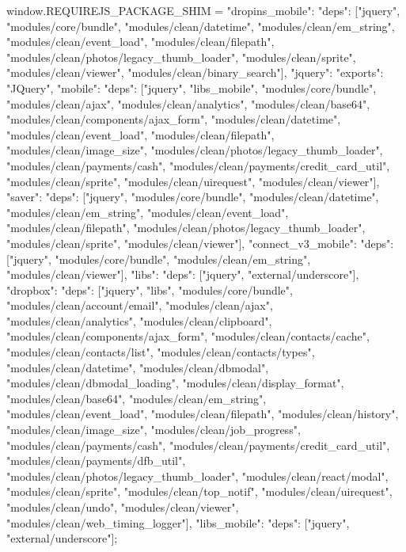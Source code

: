 {                        window.REQUIREJS_PACKAGE_SHIM = {"dropins_mobile": {"deps": ["jquery", "modules/core/bundle", "modules/clean/datetime", "modules/clean/em_string", "modules/clean/event_load", "modules/clean/filepath", "modules/clean/photos/legacy_thumb_loader", "modules/clean/sprite", "modules/clean/viewer", "modules/clean/binary_search"]}, "jquery": {"exports": "JQuery"}, "mobile": {"deps": ["jquery", "libs_mobile", "modules/core/bundle", "modules/clean/ajax", "modules/clean/analytics", "modules/clean/base64", "modules/clean/components/ajax_form", "modules/clean/datetime", "modules/clean/event_load", "modules/clean/filepath", "modules/clean/image_size", "modules/clean/photos/legacy_thumb_loader", "modules/clean/payments/cash", "modules/clean/payments/credit_card_util", "modules/clean/sprite", "modules/clean/uirequest", "modules/clean/viewer"]}, "saver": {"deps": ["jquery", "modules/core/bundle", "modules/clean/datetime", "modules/clean/em_string", "modules/clean/event_load", "modules/clean/filepath", "modules/clean/photos/legacy_thumb_loader", "modules/clean/sprite", "modules/clean/viewer"]}, "connect_v3_mobile": {"deps": ["jquery", "modules/core/bundle", "modules/clean/em_string", "modules/clean/viewer"]}, "libs": {"deps": ["jquery", "external/underscore"]}, "dropbox": {"deps": ["jquery", "libs", "modules/core/bundle", "modules/clean/account/email", "modules/clean/ajax", "modules/clean/analytics", "modules/clean/clipboard", "modules/clean/components/ajax_form", "modules/clean/contacts/cache", "modules/clean/contacts/list", "modules/clean/contacts/types", "modules/clean/datetime", "modules/clean/dbmodal", "modules/clean/dbmodal_loading", "modules/clean/display_format", "modules/clean/base64", "modules/clean/em_string", "modules/clean/event_load", "modules/clean/filepath", "modules/clean/history", "modules/clean/image_size", "modules/clean/job_progress", "modules/clean/payments/cash", "modules/clean/payments/credit_card_util", "modules/clean/payments/dfb_util", "modules/clean/photos/legacy_thumb_loader", "modules/clean/react/modal", "modules/clean/sprite", "modules/clean/top_notif", "modules/clean/uirequest", "modules/clean/undo", "modules/clean/viewer", "modules/clean/web_timing_logger"]}, "libs_mobile": {"deps": ["jquery", "external/underscore"]}};
}
